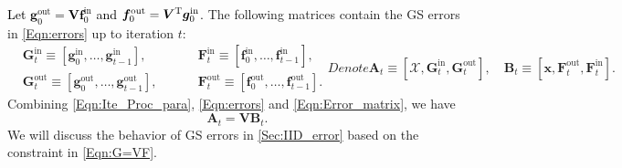 \documentclass[journal]{IEEEtran}
\newcommand{\mr}{\mathrm}
\newcommand{\BE}{\begin{equation}}
\newcommand{\EE}{\end{equation}}
\newcommand{\BS}{\begin{subequations}}
\newcommand{\ES}{\end{subequations}}
\renewcommand{\bf}{\bm}
\newcommand{\LL}[1]{\textcolor{black}{#1}}
\begin{document}

\LL{Let $\bf{g}^{\mr{out}}_0=\bf{V}\bf{f}^{\mr{in}}_0$ and $\bf{f}^{\mr{out}}_0 = \bf{V}^{\rm T}\bf{g}^{\mr{in}}_0$.} The following matrices contain the GS errors in \eqref{Eqn:errors} up to iteration $t$:
\BS\label{Eqn:Error_matrix}\begin{alignat}{2}
&\!\!\! \bf{G}^{\mr{in}}_t \equiv \left[\bf{g}_0^{\mr{in}},\dots,\bf{g}_{t-1}^{\mr{in}}\right], &\quad\;\;& \bf{F}^{\mr{in}}_t \equiv \left[\bf{f}_0^{\mr{in}},\dots,\bf{f}_{t-1}^{\mr{in}}\right], \\
& \!\!\!\bf{G}^{\mr{out}}_t \!\equiv\! \left[\bf{g}_0^{\mr{out}}\!,\dots,\bf{g}_{t-1}^{\mr{out}}\right], && \bf{F}^{\mr{out}}_t \!\equiv\! \left[\bf{f}_0^{\mr{out}}\!,\dots,\bf{f}_{t-1}^{\mr{out}}\right].
\end{alignat}
Denote
\BE 
\bf{A}_t \equiv \left[\bf{\mathcal{X}}, \bf{G}^{\mr{in}}_t, \bf{G}^{\mr{out}}_t\right],   \quad \bf{B}_t \equiv \left[ \bf{x}, \bf{F}^{\mr{out}}_t, \bf{F}^{\mr{in}}_t\right].\label{Eqn:Error_matrixc}
\EE\ES
Combining \eqref{Eqn:Ite_Proc_para}, \eqref{Eqn:errors} and \eqref{Eqn:Error_matrix}, we have 
\BE\label{Eqn:G=VF}
  \bf{A}_t =\bf{V} \bf{B}_t.
\EE
We will discuss the behavior of GS errors in \ref{Sec:IID_error} based on the constraint in \eqref{Eqn:G=VF}.  
 
\end{document}
